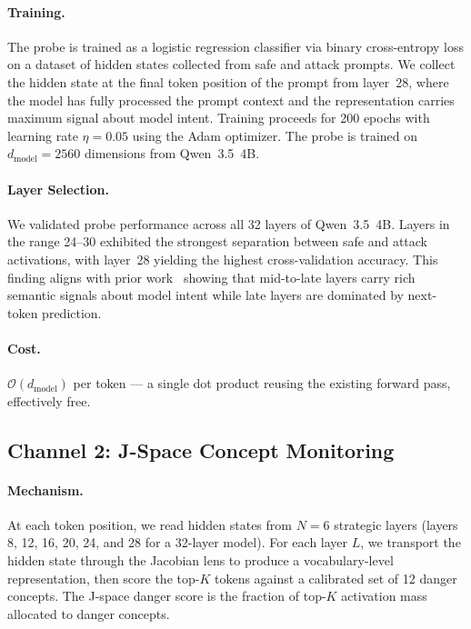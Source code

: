 \documentclass[11pt]{article}
\begin{document}
\paragraph{Training.}
The probe is trained as a logistic regression classifier via binary cross-entropy loss on a dataset of hidden states collected from safe and attack prompts. We collect the hidden state at the final token position of the prompt from layer~28, where the model has fully processed the prompt context and the representation carries maximum signal about model intent. Training proceeds for 200 epochs with learning rate $\eta = 0.05$ using the Adam optimizer. The probe is trained on $d_{\text{model}} = 2560$ dimensions from Qwen~3.5~4B.

\paragraph{Layer Selection.}
We validated probe performance across all 32 layers of Qwen~3.5~4B. Layers in the range 24--30 exhibited the strongest separation between safe and attack activations, with layer~28 yielding the highest cross-validation accuracy. This finding aligns with prior work~\cite{hiddensstate2026} showing that mid-to-late layers carry rich semantic signals about model intent while late layers are dominated by next-token prediction.

\paragraph{Cost.}
$\mathcal{O}(d_{\text{model}})$ per token — a single dot product reusing the existing forward pass, effectively free.

\subsection{Channel 2: J-Space Concept Monitoring}
\label{sec:channel2}

\paragraph{Mechanism.}
At each token position, we read hidden states from $N=6$ strategic layers (layers 8, 12, 16, 20, 24, and 28 for a 32-layer model). For each layer $L$, we transport the hidden state through the Jacobian lens to produce a vocabulary-level representation, then score the top-$K$ tokens against a calibrated set of 12 danger concepts. The J-space danger score is the fraction of top-$K$ activation mass allocated to danger concepts.
\end{document}
